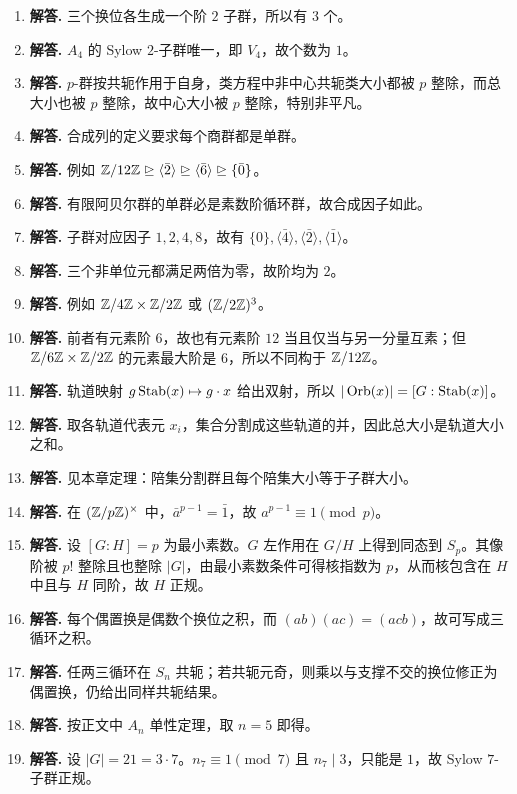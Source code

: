 \begin{enumerate}[label=\textbf{\arabic*.}, leftmargin=*, itemsep=1em]
\item \textbf{解答.} 三个换位各生成一个阶 $2$ 子群，所以有 $3$ 个。
\item \textbf{解答.} $A_4$ 的 Sylow $2$-子群唯一，即 $V_4$，故个数为 $1$。
\item \textbf{解答.} $p$-群按共轭作用于自身，类方程中非中心共轭类大小都被 $p$ 整除，而总大小也被 $p$ 整除，故中心大小被 $p$ 整除，特别非平凡。
\item \textbf{解答.} 合成列的定义要求每个商群都是单群。
\item \textbf{解答.} 例如 $\mathbb{Z}/12\mathbb{Z}\trianglerighteq\langle\bar2\rangle\trianglerighteq\langle\bar6\rangle\trianglerighteq\{\bar0\}$。
\item \textbf{解答.} 有限阿贝尔群的单群必是素数阶循环群，故合成因子如此。
\item \textbf{解答.} 子群对应因子 $1,2,4,8$，故有 $\{0\},\langle\bar4\rangle,\langle\bar2\rangle,\langle\bar1\rangle$。
\item \textbf{解答.} 三个非单位元都满足两倍为零，故阶均为 $2$。
\item \textbf{解答.} 例如 $\mathbb{Z}/4\mathbb{Z}\times\mathbb{Z}/2\mathbb{Z}$ 或 $(\mathbb{Z}/2\mathbb{Z})^3$。
\item \textbf{解答.} 前者有元素阶 $6$，故也有元素阶 $12$ 当且仅当与另一分量互素；但 $\mathbb{Z}/6\mathbb{Z}\times\mathbb{Z}/2\mathbb{Z}$ 的元素最大阶是 $6$，所以不同构于 $\mathbb{Z}/12\mathbb{Z}$。
\item \textbf{解答.} 轨道映射 $g\operatorname{Stab}(x)\mapsto g\cdot x$ 给出双射，所以 $|\operatorname{Orb}(x)|=[G:\operatorname{Stab}(x)]$。
\item \textbf{解答.} 取各轨道代表元 $x_i$，集合分割成这些轨道的并，因此总大小是轨道大小之和。
\item \textbf{解答.} 见本章定理：陪集分割群且每个陪集大小等于子群大小。
\item \textbf{解答.} 在 $(\mathbb{Z}/p\mathbb{Z})^\times$ 中，$\bar a^{p-1}=\bar1$，故 $a^{p-1}\equiv1\pmod p$。
\item \textbf{解答.} 设 $[G:H]=p$ 为最小素数。$G$ 左作用在 $G/H$ 上得到同态到 $S_p$。其像阶被 $p!$ 整除且也整除 $|G|$，由最小素数条件可得核指数为 $p$，从而核包含在 $H$ 中且与 $H$ 同阶，故 $H$ 正规。
\item \textbf{解答.} 每个偶置换是偶数个换位之积，而 $(ab)(ac)=(acb)$，故可写成三循环之积。
\item \textbf{解答.} 任两三循环在 $S_n$ 共轭；若共轭元奇，则乘以与支撑不交的换位修正为偶置换，仍给出同样共轭结果。
\item \textbf{解答.} 按正文中 $A_n$ 单性定理，取 $n=5$ 即得。
\item \textbf{解答.} 设 $|G|=21=3\cdot7$。$n_7\equiv1\pmod7$ 且 $n_7\mid3$，只能是 $1$，故 Sylow $7$-子群正规。

\end{enumerate}
